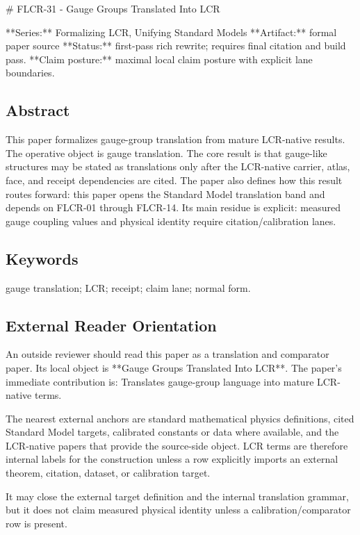 \documentclass[11pt]{article}
\begin{document}
﻿\# FLCR-31 - Gauge Groups Translated Into LCR

**Series:** Formalizing LCR, Unifying Standard Models
**Artifact:** formal paper source
**Status:** first-pass rich rewrite; requires final citation and build pass.
**Claim posture:** maximal local claim posture with explicit lane boundaries.

\subsection*{Abstract}

This paper formalizes gauge-group translation from mature LCR-native results. The operative object is gauge translation. The core result is that gauge-like structures may be stated as translations only after the LCR-native carrier, atlas, face, and receipt dependencies are cited. The paper also defines how this result routes forward: this paper opens the Standard Model translation band and depends on FLCR-01 through FLCR-14. Its main residue is explicit: measured gauge coupling values and physical identity require citation/calibration lanes.

\subsection*{Keywords}

gauge translation; LCR; receipt; claim lane; normal form.

\subsection*{External Reader Orientation}

An outside reviewer should read this paper as a translation and comparator paper. Its local object is **Gauge Groups Translated Into LCR**. The paper's immediate contribution is: Translates gauge-group language into mature LCR-native terms.

The nearest external anchors are standard mathematical physics definitions, cited Standard Model targets, calibrated constants or data where available, and the LCR-native papers that provide the source-side object. LCR terms are therefore internal labels for the construction unless a row explicitly imports an external theorem, citation, dataset, or calibration target.

It may close the external target definition and the internal translation grammar, but it does not claim measured physical identity unless a calibration/comparator row is present.
\end{document}

